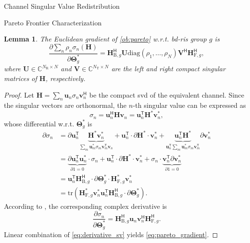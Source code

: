 \documentclass[journal]{IEEEtran}
\newtheorem{lemma}{Lemma}
\begin{document}
\begin{section}{Channel Singular Value Redistribution}
\begin{subsection}{Pareto Frontier Characterization}
		\begin{lemma}
			The Euclidean gradient of \eqref{ob:pareto} w.r.t. \gls{bd}-\gls{ris} group $g$ is
			\begin{equation}
				\frac{\partial \sum_n \rho_n \sigma_n(\mathbf{H})}{\partial \mathbf{\Theta}_g^*} = \mathbf{H}_{\mathrm{B},g}^\mathsf{H} \mathbf{U} \mathrm{diag}(\rho_1,\ldots,\rho_N) \mathbf{V}^\mathsf{H} \mathbf{H}_{\mathrm{F},g}^\mathsf{H},
				\label{eq:pareto_gradient}
			\end{equation}
			where $\mathbf{U} \in \mathbb{C}^{N_\mathrm{R} \times N}$ and $\mathbf{V} \in \mathbb{C}^{N_\mathrm{T} \times N}$ are the left and right compact singular matrices of $\mathbf{H}$, respectively.
		\end{lemma}
		\begin{proof}
			Let $\mathbf{H} = \sum_n \mathbf{u}_n \sigma_n \mathbf{v}_n^\mathsf{H}$ be the compact \gls{svd} of the equivalent channel.
			Since the singular vectors are orthonormal, the $n$-th singular value can be expressed as
			\begin{equation}
				\sigma_n = \mathbf{u}_n^\mathsf{H} \mathbf{H} \mathbf{v}_n = \mathbf{u}_n^\mathsf{T} \mathbf{H}^* \mathbf{v}_n^*,
			\end{equation}
			whose differential w.r.t. $\mathbf{\Theta}_g^*$ is
			\begin{align*}
				\partial \sigma_n
				& = \partial \mathbf{u}_n^\mathsf{T} \underbrace{\mathbf{H}^* \mathbf{v}_n^*}_{\sum_m \mathbf{u}_m^* \sigma_m \mathbf{v}_m^\mathsf{T} \mathbf{v}_n} + \mathbf{u}_n^\mathsf{T} \cdot \partial \mathbf{H}^* \cdot \mathbf{v}_n^* + \underbrace{\mathbf{u}_n^\mathsf{T} \mathbf{H}^*}_{\mathbf{u}_n^\mathsf{T} \sum_m \mathbf{u}_m^* \sigma_m \mathbf{v}_m^\mathsf{T}} \partial \mathbf{v}_n^*\\
				& = \underbrace{\partial \mathbf{u}_n^\mathsf{T} \mathbf{u}_n^*}_{\partial 1 = 0} \cdot \sigma_n + \mathbf{u}_n^\mathsf{T} \cdot \partial \mathbf{H}^* \cdot \mathbf{v}_n^* + \sigma_n \cdot \underbrace{\mathbf{v}_n^\mathsf{T} \partial \mathbf{v}_n^*}_{\partial 1 = 0}\\
				& = \mathbf{u}_n^\mathsf{T} \mathbf{H}_{\mathrm{B},g}^\mathsf{H} \cdot \partial \mathbf{\Theta}_g^* \cdot \mathbf{H}_{\mathrm{F},g}^* \mathbf{v}_n^*\\
				& = \mathrm{tr}(\mathbf{H}_{\mathrm{F},g}^* \mathbf{v}_n^*\mathbf{u}_n^\mathsf{T} \mathbf{H}_{\mathrm{B},g}^\mathsf{H} \cdot \partial \mathbf{\Theta}_g^*).
			\end{align*}
			According to \cite{Hjorungnes2007}, the corresponding complex derivative is
			\begin{equation}
				\frac{\partial \sigma_n}{\partial \mathbf{\Theta}_g^*} = \mathbf{H}_{\mathrm{B},g}^\mathsf{H} \mathbf{u}_n \mathbf{v}_n^\mathsf{H} \mathbf{H}_{\mathrm{F},g}^\mathsf{H}.
				\label{eq:derivative_sv}
			\end{equation}
			Linear combination of \eqref{eq:derivative_sv} yields \eqref{eq:pareto_gradient}.
		\end{proof}


\end{subsection}
\end{section}
\end{document}
